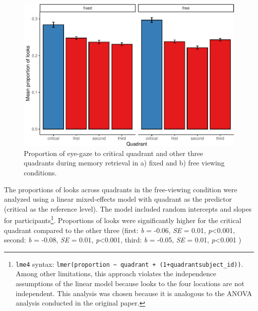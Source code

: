 \documentclass[
  man,floatsintext]{apa6}
\begin{document}
\begin{figure}
\centering
\includegraphics{manuscript_files/figure-latex/E2-gaze-fig-both-conds-1.pdf}
\caption{\label{fig:E2-gaze-fig-both-conds}Proportion of eye-gaze to critical quadrant and other three quadrants during memory retrieval in a) fixed and b) free viewing conditions.}
\end{figure}

The proportions of looks across quadrants in the free-viewing condition were analyzed using a linear mixed-effects model with quadrant as the predictor (critical as the reference level). The model included random intercepts and slopes for participants\footnote{ \texttt{lme4} syntax: \texttt{lmer(proportion\ \textasciitilde{}\ quadrant\ +\ (1+quadrant\textbar{}subject\_id))}. Among other limitations, this approach violates the independence assumptions of the linear model because looks to the four locations are not independent. This analysis was chosen because it is analogous to the ANOVA analysis conducted in the original paper.}. Proportions of looks were significantly higher for the critical quadrant compared to the other three (first: \emph{b} = -0.06, \emph{SE} = 0.01, \emph{p}\textless0.001, second: \emph{b} = -0.08, \emph{SE} = 0.01, \emph{p}\textless0.001, third: \emph{b} = -0.05, \emph{SE} = 0.01, \emph{p}\textless0.001 )
\end{document}
